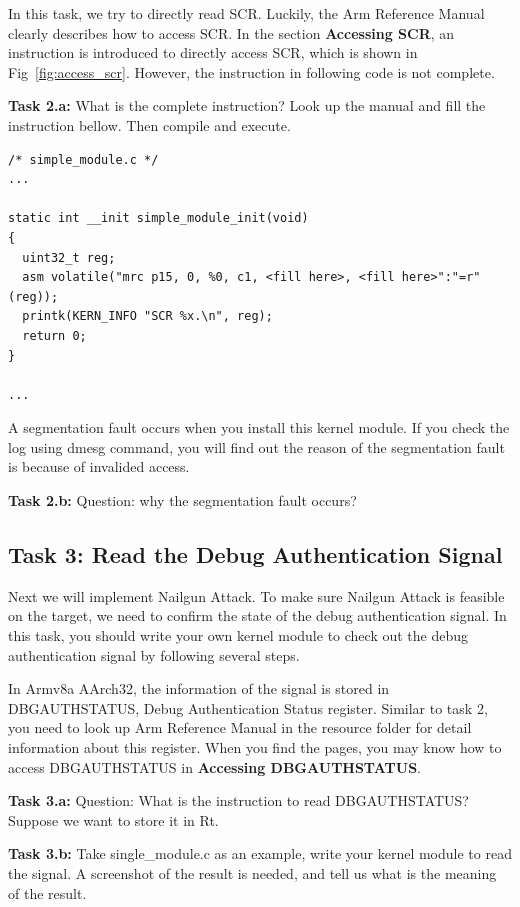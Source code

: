 In this task, we try to directly read SCR. Luckily, the Arm Reference Manual clearly describes how to access SCR. In the section \textbf{Accessing SCR}, an instruction is introduced to directly access SCR, which is shown in Fig~\ref{fig:access_scr}. However, the instruction in following code is not complete.

\textbf{Task 2.a:} What is the complete instruction? Look up the manual and fill the instruction bellow. Then compile and execute.

\begin{lstlisting}
/* simple_module.c */
...

static int __init simple_module_init(void)
{
  uint32_t reg;
  asm volatile("mrc p15, 0, %0, c1, <fill here>, <fill here>":"=r"(reg));
  printk(KERN_INFO "SCR %x.\n", reg);
  return 0;
}

...
\end{lstlisting}

A segmentation fault occurs when you install this kernel module. If you check the log using dmesg command, you will find out the reason of the segmentation fault is because of invalided access. 

\textbf{Task 2.b:} Question: why the segmentation fault occurs?

\subsection{Task 3: Read the Debug Authentication Signal}

Next we will implement Nailgun Attack. To make sure Nailgun Attack is feasible on the target, we need to confirm the state of the debug authentication signal. In this task, you should write your own kernel module to check out the debug authentication signal by following several steps.

In Armv8a AArch32, the information of the signal is stored in DBGAUTHSTATUS, Debug Authentication Status register. Similar to task 2, you need to look up Arm Reference Manual in the resource folder for detail information about this register. When you find the pages, you may know how to access DBGAUTHSTATUS in \textbf{Accessing DBGAUTHSTATUS}.

\textbf{Task 3.a:} Question: What is the instruction to read DBGAUTHSTATUS? Suppose we want to store it in Rt.

\textbf{Task 3.b:} Take single\_module.c as an example, write your kernel module to read the signal. A screenshot of the result is needed, and tell us what is the meaning of the result.

